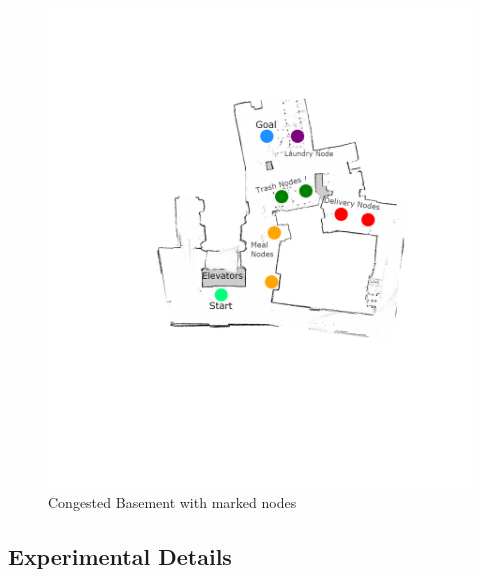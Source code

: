   \begin{figure}[!htb]
    \centering
    \includegraphics[width=\linewidth]{images/results/overlay.png}
    \caption{Congested Basement with marked nodes}
    \label{figure:basement_congestion}
  \end{figure}

  \clearpage


  \subsection{ Experimental Details }


